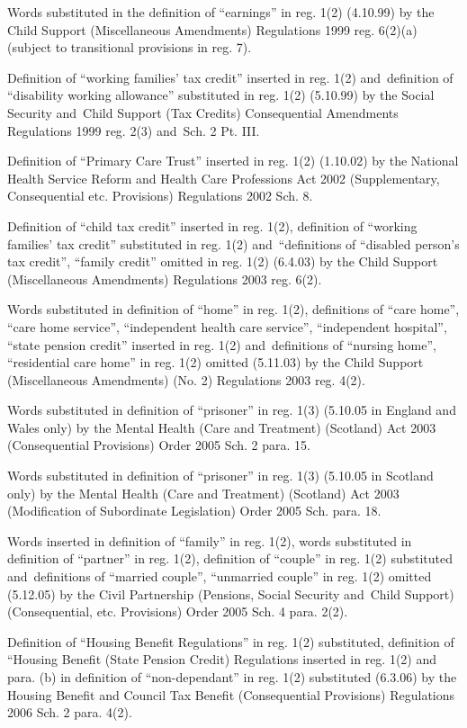\documentclass[12pt,a4paper]{article}
\begin{document}
{Words substituted in the definition of ``earnings'' in reg. 1(2) (4.10.99) by the Child Support (Miscellaneous Amendments) Regulations 1999 reg. 6(2)(a) (subject to transitional provisions in reg. 7).

Definition of ``working families' tax credit'' inserted in reg. 1(2) and~definition of ``disability working allowance'' substituted in reg. 1(2) (5.10.99) by the Social Security and~Child Support (Tax Credits) Consequential Amendments Regulations 1999 reg. 2(3) and~Sch. 2 Pt. III.

Definition of ``Primary Care Trust'' inserted in reg. 1(2) (1.10.02) by the National Health Service Reform and Health Care Professions Act 2002 (Supplementary, Consequential etc. Provisions) Regulations 2002 Sch. 8.

Definition of ``child tax credit'' inserted in reg. 1(2), definition of ``working families' tax credit'' substituted in reg. 1(2) and~``definitions of ``disabled person's tax credit'', ``family credit'' omitted in reg. 1(2) (6.4.03) by the Child Support (Miscellaneous Amendments) Regulations 2003 reg. 6(2).

Words substituted in definition of ``home'' in reg. 1(2), definitions of ``care home'', ``care home service'', ``independent health care service'', ``independent hospital'', ``state pension credit'' inserted in reg. 1(2) and~definitions of ``nursing home'', ``residential care home'' in reg. 1(2) omitted (5.11.03) by the Child Support (Miscellaneous Amendments) (No. 2) Regulations 2003 reg. 4(2).

Words substituted in definition of ``prisoner'' in reg. 1(3) (5.10.05 in England and Wales only) by the Mental Health (Care and Treatment) (Scotland) Act 2003 (Consequential Provisions) Order 2005 Sch. 2 para. 15.

Words substituted in definition of ``prisoner'' in reg. 1(3) (5.10.05 in Scotland only) by the Mental Health (Care and Treatment) (Scotland) Act 2003 (Modification of Subordinate Legislation) Order 2005 Sch. para. 18.

Words inserted in definition of ``family'' in reg. 1(2), words substituted in definition of ``partner'' in reg. 1(2), definition of ``couple'' in reg. 1(2) substituted and~definitions of ``married couple'', ``unmarried couple'' in reg. 1(2) omitted (5.12.05) by the Civil Partnership (Pensions, Social Security and~Child Support) (Consequential, etc. Provisions) Order 2005 Sch. 4 para. 2(2).

Definition of ``Housing Benefit Regulations'' in reg. 1(2) substituted, definition of ``Housing Benefit (State Pension Credit) Regulations inserted in reg. 1(2) and para. (b) in definition of ``non-dependant'' in reg. 1(2) substituted (6.3.06) by the Housing Benefit and Council Tax Benefit (Consequential Provisions) Regulations 2006 Sch. 2 para. 4(2).

}
\end{document}
